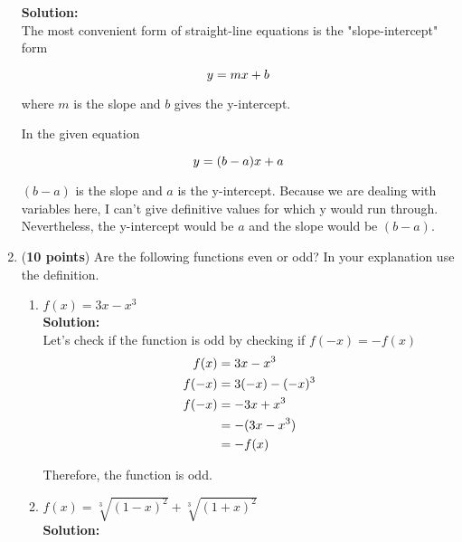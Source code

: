 \documentclass[a4paper]{article}
\begin{document}
\begin{enumerate}
\textbf{Solution:}\\

The most convenient form of straight-line equations is the "slope-intercept" form

\begin{equation}
	y = mx + b \notag
\end{equation}

where $m$ is the slope and $b$ gives the y-intercept.

In the given equation 

\begin{equation}
	y = (b-a)x + a \notag
\end{equation}

$(b-a)$ is the slope and $a$ is the y-intercept. Because we are dealing with variables here, I can't give definitive values for which y would run through. Nevertheless, the y-intercept would be $a$ and the slope would be $(b-a)$.


\item (\textbf{10 points}) Are the following functions even or odd? In your explanation use the definition.\\




\begin{enumerate}
	\item $f(x) = 3x - x^3$\\
	\textbf{Solution:}\\
	
		Let's check if the function is odd by checking if $f(-x) = -f(x)$\\
	\begin{align}
		f(x) &= 3x - x^3 \notag\\
		f(-x) &= 3(-x) - (-x)^3 \notag\\
		f(-x) &= -3x + x^3 \notag\\
		&= -(3x - x^3) \notag\\
		&= -f(x) \notag
	\end{align}
	
	Therefore, the function is odd.\\

	\item $f(x) = \sqrt[3]{(1-x)^2} + \sqrt[3]{(1+x)^2}$\\
	\textbf{Solution:}\\
	

\end{enumerate}
\end{enumerate}
\end{document}
